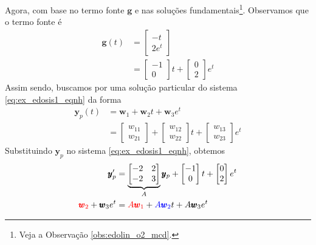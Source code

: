 \begin{ex}
  Agora, com base no termo fonte $\pmb{g}$ e nas soluções fundamentais\footnote{Veja a Observação \ref{obs:edolin_o2_mcd}.}. Observamos que o termo fonte é
  \begin{align}
    \pmb{g}(t) &=
    \begin{bmatrix}
      -t\\
      2e^t
    \end{bmatrix}\\
    &=
    \begin{bmatrix}
      -1\\0
    \end{bmatrix}t+
    \begin{bmatrix}
      0\\
      2
    \end{bmatrix}e^t
  \end{align}
  Assim sendo, buscamos por uma solução particular do sistema \eqref{eq:ex_edosis1_eqnh} da forma
  \begin{align}
    \pmb{y}_p(t) &= \pmb{w}_1 + \pmb{w}_2t + \pmb{w}_3e^{t} \\
    &=
    \begin{bmatrix}
      w_{11} \\
      w_{21}
    \end{bmatrix} +
    \begin{bmatrix}
      w_{12} \\
      w_{22}
    \end{bmatrix}t +
    \begin{bmatrix}
      w_{13} \\
      w_{23}
    \end{bmatrix}e^{t}
  \end{align}
  Substituindo $\pmb{y}_p$ no sistema \eqref{eq:ex_edosis1_eqnh}, obtemos
  \begin{align}
    \pmb{y}_p' &=
    \underbrace{\begin{bmatrix}
        -2 & 2 \\
        -2 & 3
    \end{bmatrix}}_{A}\pmb{y}_p +
    \begin{bmatrix}
      -1\\
      0
    \end{bmatrix}t +
    \begin{bmatrix}
      0 \\
      2
    \end{bmatrix}e^{t} \\
                 {\color{red}\pmb{w}_2} + \pmb{w}_3e^t &= {\color{red}A\pmb{w}_1} + {\color{blue}A\pmb{w}_2}t + A\pmb{w}_3e^t \\

\end{align}
\end{ex}
